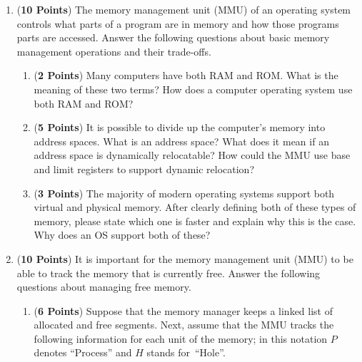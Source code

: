 \documentclass[12pt,epsf,psfig,graphics]{article}
\begin{document}
\begin{enumerate}
  
\item ({\bf 10 Points}) The memory management unit (MMU) of an operating system controls what parts of a program are in
  memory and how those programs parts are accessed.  Answer the following questions about basic memory management
  operations and their trade-offs.
  
  \begin{enumerate}
          
  \item ({\bf 2 Points}) Many computers have both RAM and ROM.  What is the meaning of these two terms?  How does a
    computer operating system use both RAM and ROM?

  \item ({\bf 5 Points}) It is possible to divide up the computer's memory into address spaces.  What is an address
    space?  What does it mean if an address space is dynamically relocatable? How could the MMU use base and limit
    registers to support dynamic relocation?   

  \item ({\bf 3 Points}) The majority of modern operating systems support both virtual and physical memory.  After
    clearly defining both of these types of memory, please state which one is faster and explain why this is the case.
    Why does an OS support both of these?
    
  \end{enumerate}
        
\newpage

% 
\item ({\bf 10 Points}) It is important for the memory management unit (MMU) to be able to track the memory that is
  currently free.  Answer the following questions about managing free memory.

  \begin{enumerate}
          
  \item ({\bf 6 Points}) Suppose that the memory manager keeps a linked list of allocated and free segments.  Next,
    assume that the MMU tracks the following information for each unit of the memory; in this notation $P$
    denotes ``Process'' and $H$ stands \mbox{for ``Hole''}.


\end{enumerate}
\end{enumerate}
\end{document}
